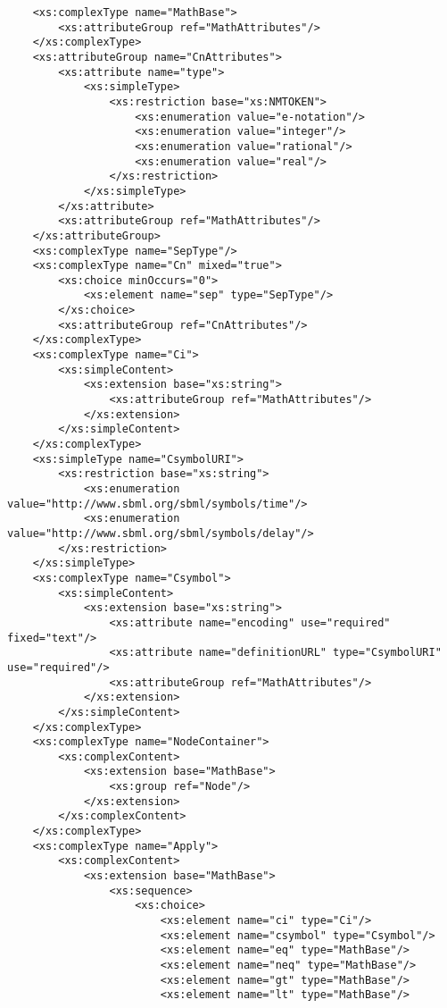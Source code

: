 \begin{footnotesize}
\begin{verbatim}
    <xs:complexType name="MathBase">
        <xs:attributeGroup ref="MathAttributes"/>
    </xs:complexType>
    <xs:attributeGroup name="CnAttributes">
        <xs:attribute name="type">
            <xs:simpleType>
                <xs:restriction base="xs:NMTOKEN">
                    <xs:enumeration value="e-notation"/>
                    <xs:enumeration value="integer"/>
                    <xs:enumeration value="rational"/>
                    <xs:enumeration value="real"/>
                </xs:restriction>
            </xs:simpleType>
        </xs:attribute>
        <xs:attributeGroup ref="MathAttributes"/>
    </xs:attributeGroup>
    <xs:complexType name="SepType"/>
    <xs:complexType name="Cn" mixed="true">
        <xs:choice minOccurs="0">
            <xs:element name="sep" type="SepType"/>
        </xs:choice>
        <xs:attributeGroup ref="CnAttributes"/>
    </xs:complexType>
    <xs:complexType name="Ci">
        <xs:simpleContent>
            <xs:extension base="xs:string">
                <xs:attributeGroup ref="MathAttributes"/>
            </xs:extension>
        </xs:simpleContent>
    </xs:complexType>
    <xs:simpleType name="CsymbolURI">
        <xs:restriction base="xs:string">
            <xs:enumeration value="http://www.sbml.org/sbml/symbols/time"/>
            <xs:enumeration value="http://www.sbml.org/sbml/symbols/delay"/>
        </xs:restriction>
    </xs:simpleType>
    <xs:complexType name="Csymbol">
        <xs:simpleContent>
            <xs:extension base="xs:string">
                <xs:attribute name="encoding" use="required" fixed="text"/>
                <xs:attribute name="definitionURL" type="CsymbolURI" use="required"/>
                <xs:attributeGroup ref="MathAttributes"/>
            </xs:extension>
        </xs:simpleContent>
    </xs:complexType>
    <xs:complexType name="NodeContainer">
        <xs:complexContent>
            <xs:extension base="MathBase">
                <xs:group ref="Node"/>
            </xs:extension>
        </xs:complexContent>
    </xs:complexType>
    <xs:complexType name="Apply">
        <xs:complexContent>
            <xs:extension base="MathBase">
                <xs:sequence>
                    <xs:choice>
                        <xs:element name="ci" type="Ci"/>
                        <xs:element name="csymbol" type="Csymbol"/>
                        <xs:element name="eq" type="MathBase"/>
                        <xs:element name="neq" type="MathBase"/>
                        <xs:element name="gt" type="MathBase"/>
                        <xs:element name="lt" type="MathBase"/>

\end{verbatim}
\end{footnotesize}
